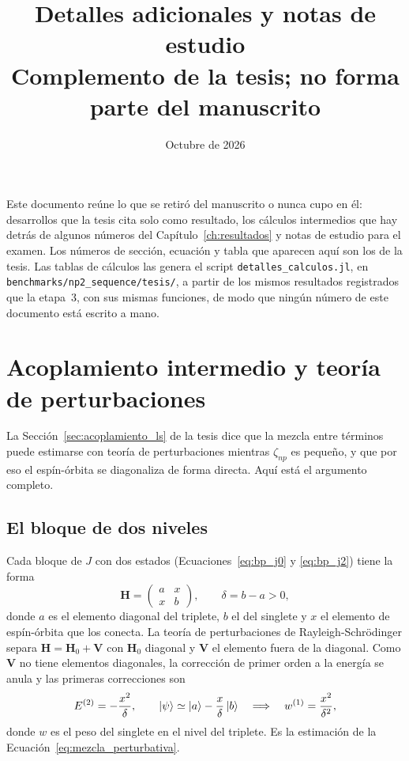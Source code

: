 \documentclass[11pt,a4paper]{article}
\title{Detalles adicionales y notas de estudio\\[0.3em]
\large Complemento de la tesis; no forma parte del manuscrito}
\author{}
\date{Octubre de 2026}
\begin{document}
\maketitle
\vspace{-2em}

Este documento reúne lo que se retiró del manuscrito o nunca cupo en él: desarrollos que la tesis
cita solo como resultado, los cálculos intermedios que hay detrás de algunos números del
Capítulo~\ref{ch:resultados} y notas de estudio para el examen. Los números de sección, ecuación y
tabla que aparecen aquí son los de la tesis. Las tablas de cálculos las genera el script
\texttt{detalles\_calculos.jl}, en \texttt{benchmarks/np2\_sequence/tesis/}, a partir de los mismos resultados
registrados que la etapa~3, con sus mismas funciones, de modo que ningún número de este documento
está escrito a mano.

\tableofcontents

\section{Acoplamiento intermedio y teoría de perturbaciones}
\label{det:perturbaciones}

La Sección~\ref{sec:acoplamiento_ls} de la tesis dice que la mezcla entre términos puede
estimarse con teoría de perturbaciones mientras $\zeta_{np}$ es pequeño, y que por eso el
espín-órbita se diagonaliza de forma directa. Aquí está el argumento completo.

\subsection{El bloque de dos niveles}

Cada bloque de $J$ con dos estados (Ecuaciones~\eqref{eq:bp_j0} y \eqref{eq:bp_j2}) tiene la forma
\begin{equation}
  \bm{H} = \begin{pmatrix} a & x \\ x & b \end{pmatrix}, \qquad \delta = b - a > 0,
\end{equation}
donde $a$ es el elemento diagonal del triplete, $b$ el del singlete y $x$ el elemento de
espín-órbita que los conecta. La teoría de perturbaciones de Rayleigh-Schrödinger separa
$\bm{H} = \bm{H}_0 + \bm{V}$ con $\bm{H}_0$ diagonal y $\bm{V}$ el elemento fuera de la diagonal.
Como $\bm{V}$ no tiene elementos diagonales, la corrección de primer orden a la energía se anula y
las primeras correcciones son
\begin{equation}
  E^{(2)} = -\frac{x^2}{\delta}, \qquad
  \ket{\psi} \simeq \ket{a} - \frac{x}{\delta}\ket{b}
  \quad\Longrightarrow\quad w^{(1)} = \frac{x^2}{\delta^2},
\end{equation}
donde $w$ es el peso del singlete en el nivel del triplete. Es la estimación de la
Ecuación~\eqref{eq:mezcla_perturbativa}.
\end{document}
